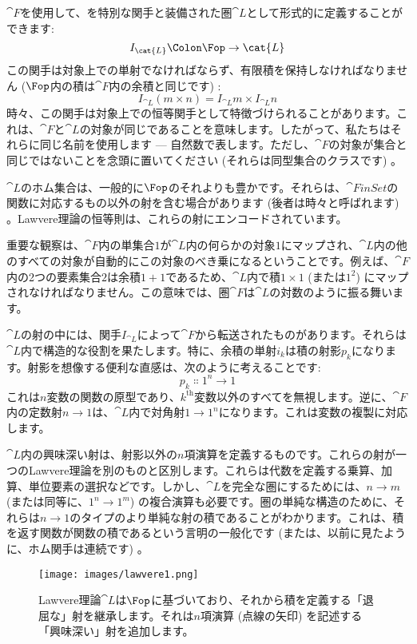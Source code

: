$\cat{F}$を使用して、を特別な関手と装備された圏$\cat{L}$として形式的に定義することができます: 
\[I_{\cat{L}} \Colon \Fop \to \cat{L}\]
この関手は対象上での単射でなければならず、有限積を保持しなければなりません ($\Fop$内の積は$\cat{F}$内の余積と同じです) : 
\[I_{\cat{L}} (m\times{}n) = I_{\cat{L}} m\times{}I_{\cat{L}} n\]
時々、この関手は対象上での恒等関手として特徴づけられることがあります。これは、$\cat{F}$と$\cat{L}$の対象が同じであることを意味します。したがって、私たちはそれらに同じ名前を使用します --- 自然数で表します。ただし、$\cat{F}$の対象が集合と同じではないことを念頭に置いてください (それらは同型集合のクラスです) 。

$\cat{L}$のホム集合は、一般的に$\Fop$のそれよりも豊かです。それらは、$\cat{FinSet}$の関数に対応するもの以外の射を含む場合があります (後者は時々と呼ばれます) 。Lawvere理論の恒等則は、これらの射にエンコードされています。

重要な観察は、$\cat{F}$内の単集合$1$が$\cat{L}$内の何らかの対象$1$にマップされ、$\cat{L}$内の他のすべての対象が自動的にこの対象のべき乗になるということです。例えば、$\cat{F}$内の2つの要素集合$2$は余積$1 + 1$であるため、$\cat{L}$内で積$1 \times 1$ (または$1^2$) にマップされなければなりません。この意味では、圏$\cat{F}$は$\cat{L}$の対数のように振る舞います。

$\cat{L}$の射の中には、関手$I_{\cat{L}}$によって$\cat{F}$から転送されたものがあります。それらは$\cat{L}$内で構造的な役割を果たします。特に、余積の単射$i_k$は積の射影$p_k$になります。射影を想像する便利な直感は、次のように考えることです: 
\[p_k \Colon 1^n \to 1\]
これは$n$変数の関数の原型であり、$k^\text{th}$変数以外のすべてを無視します。逆に、$\cat{F}$内の定数射$n \to 1$は、$\cat{L}$内で対角射$1 \to 1^n$になります。これは変数の複製に対応します。

$\cat{L}$内の興味深い射は、射影以外の$n$項演算を定義するものです。これらの射が一つのLawvere理論を別のものと区別します。これらは代数を定義する乗算、加算、単位要素の選択などです。しかし、$\cat{L}$を完全な圏にするためには、$n \to m$ (または同等に、$1^n \to 1^m$) の複合演算も必要です。圏の単純な構造のために、それらは$n \to 1$のタイプのより単純な射の積であることがわかります。これは、積を返す関数が関数の積であるという言明の一般化です (または、以前に見たように、ホム関手は連続です) 。

\begin{figure}[H]
  \centering
  \texttt{[image: images/lawvere1.png]}
  \caption{Lawvere理論$\cat{L}$は$\Fop$に基づいており、それから積を定義する「退屈な」射を継承します。それは$n$項演算 (点線の矢印) を記述する「興味深い」射を追加します。}
\end{figure}

